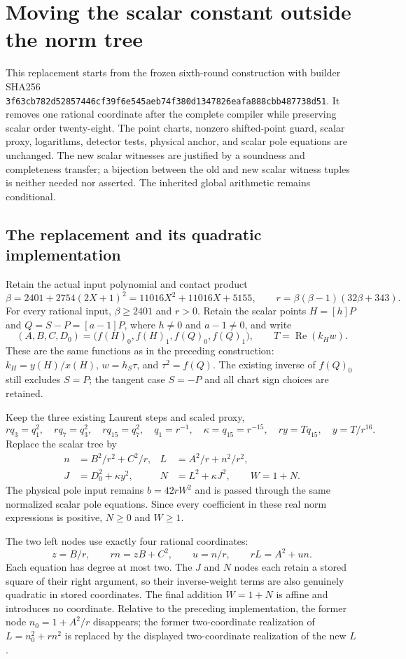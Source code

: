 \section{Moving the scalar constant outside the norm tree}

This replacement starts from the frozen sixth-round construction with
builder SHA256
\texttt{3f63cb782d52857446cf39f6e545aeb74f380d1347826eafa888cbb487738d51}.
It removes one rational coordinate after the complete compiler while
preserving scalar order twenty-eight. The point charts, nonzero shifted-point
guard, scalar proxy, logarithms, detector tests, physical anchor, and scalar
pole equations are unchanged. The new scalar witnesses are justified by a
soundness and completeness transfer; a bijection between the old and new
scalar witness tuples is neither needed nor asserted. The inherited global
arithmetic remains conditional.

\subsection{The replacement and its quadratic implementation}

Retain the actual input polynomial and contact product
\[
 \beta=2401+2754(2X+1)^2
       =11016X^2+11016X+5155,
 \qquad r=\beta(\beta-1)(32\beta+343).
\]
For every rational input, $\beta\ge2401$ and $r>0$. Retain the scalar
points $H=[h]P$ and $Q=S-P=[a-1]P$, where $h\ne0$ and $a-1\ne0$,
and write
\[
 (A,B,C,D_0)=\bigl(f(H)_0,f(H)_1,f(Q)_0,f(Q)_1\bigr),
 \qquad T=\operatorname{Re}(k_Hw).
\]
These are the same functions as in the preceding construction:
$k_H=y(H)/x(H)$, $w=h_S\tau$, and $\tau^2=f(Q)$.
The existing inverse of $f(Q)_0$ still excludes $S=P$; the tangent case
$S=-P$ and all chart sign choices are retained.

Keep the three existing Laurent steps and scaled proxy,
\[
 rq_3=q_1^2,\quad rq_7=q_3^2,\quad rq_{15}=q_7^2,
 \quad q_1=r^{-1},\quad \kappa=q_{15}=r^{-15},
 \quad ry=Tq_{15},\quad y=T/r^{16}.
\]
Replace the scalar tree by
\begin{align*}
 n&=B^2/r^2+C^2/r,&
 L&=A^2/r+n^2/r^2,\\
 J&=D_0^2+\kappa y^2,&
 N&=L^2+\kappa J^2,\qquad W=1+N.
\end{align*}
The physical pole input remains $b=42rW^2$ and is passed through the
same normalized scalar pole equations. Since every coefficient in these
real norm expressions is positive, $N\ge0$ and $W\ge1$.

The two left nodes use exactly four rational coordinates:
\[
 z=B/r,\qquad rn=zB+C^2,\qquad u=n/r,\qquad rL=A^2+un.
\]
Each equation has degree at most two. The $J$ and $N$ nodes each retain
a stored square of their right argument, so their inverse-weight terms
are also genuinely quadratic in stored coordinates. The final addition
$W=1+N$ is affine and introduces no coordinate. Relative to the preceding
implementation, the former node $n_0=1+A^2/r$ disappears; the former
two-coordinate realization of $L=n_0^2+rn^2$ is replaced by the displayed
two-coordinate realization of the new $L$.

